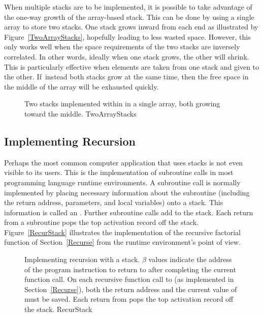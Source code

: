 When multiple stacks are to be
implemented, it is possible to take advantage of the one-way growth of
the array-based stack.
This can be done by using a single array to store two stacks.
One stack grows inward from each end as illustrated by
Figure~\ref{TwoArrayStacks}, hopefully leading to less wasted space.
However, this only works well when the space requirements of the two
stacks are inversely correlated.
In other words, ideally when one stack grows, the other will shrink.
This is particularly effective when elements are taken from
one stack and given to the other.
If~instead both stacks grow at the same time, then the free space
in the middle of the array will be exhausted
quickly.

\begin{figure}
\vspace{-\bigskipamount}\vspace{-\medskipamount}

{Two stacks implemented within in a single array, both growing toward
the middle.}
{TwoArrayStacks}
\smallskip
\end{figure}

\subsection{Implementing Recursion}
\label{ImpRecur}

Perhaps the most common computer application that uses stacks is not
even visible to its users.
This is the implementation of subroutine calls in most programming
language runtime environments.
A subroutine call is normally implemented by placing necessary
information about the subroutine (including the return address,
parameters, and local variables) onto a stack.
This information is called an
.
Further subroutine calls add to the stack.
Each return from a subroutine pops the top activation record
off the stack.
Figure~\ref{RecurStack} illustrates the implementation of
the recursive factorial function of Section~\ref{Recurse}
from the runtime environment's point of view.

\begin{figure}
\smallskip

{Implementing recursion with a stack.
$\beta$ values indicate the address of the program instruction to
return to after completing the current function call.
On each recursive function call to 
(as implemented in Section~\ref{Recurse}), both the return
address and the current value of  must be saved.
Each return from  pops the top activation record off the
stack.
}{RecurStack}
\bigskip
\end{figure}

